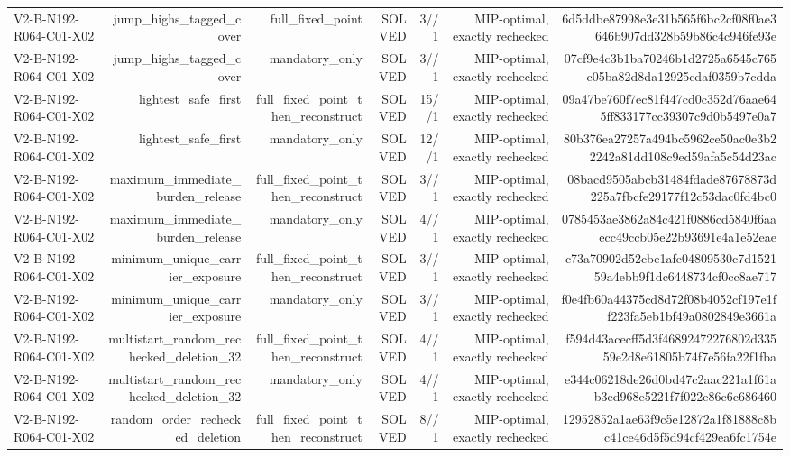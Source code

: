 {\begin{longtable}{lrrrrrr}
V2-B-N192-R064-C01-X02 & jump\_highs\_tagged\_cover & full\_fixed\_point & SOLVED & 3//1 & MIP-optimal, exactly rechecked & 6d5ddbe87998e3e31b565f6bc2cf08f0ae3646b907dd328b59b86c4c946fe93e \\
V2-B-N192-R064-C01-X02 & jump\_highs\_tagged\_cover & mandatory\_only & SOLVED & 3//1 & MIP-optimal, exactly rechecked & 07cf9e4c3b1ba70246b1d2725a6545c765c05ba82d8da12925cdaf0359b7cdda \\
V2-B-N192-R064-C01-X02 & lightest\_safe\_first & full\_fixed\_point\_then\_reconstruct & SOLVED & 15//1 & MIP-optimal, exactly rechecked & 09a47be760f7ec81f447cd0c352d76aae645ff833177cc39307c9d0b5497e0a7 \\
V2-B-N192-R064-C01-X02 & lightest\_safe\_first & mandatory\_only & SOLVED & 12//1 & MIP-optimal, exactly rechecked & 80b376ea27257a494bc5962ce50ac0e3b22242a81dd108c9ed59afa5c54d23ac \\
V2-B-N192-R064-C01-X02 & maximum\_immediate\_burden\_release & full\_fixed\_point\_then\_reconstruct & SOLVED & 3//1 & MIP-optimal, exactly rechecked & 08bacd9505abcb31484fdade87678873d225a7fbcfe29177f12c53dac0fd4bc0 \\
V2-B-N192-R064-C01-X02 & maximum\_immediate\_burden\_release & mandatory\_only & SOLVED & 4//1 & MIP-optimal, exactly rechecked & 0785453ae3862a84c421f0886cd5840f6aaecc49ccb05e22b93691e4a1e52eae \\
V2-B-N192-R064-C01-X02 & minimum\_unique\_carrier\_exposure & full\_fixed\_point\_then\_reconstruct & SOLVED & 3//1 & MIP-optimal, exactly rechecked & c73a70902d52cbe1afe04809530c7d152159a4ebb9f1dc6448734cf0cc8ae717 \\
V2-B-N192-R064-C01-X02 & minimum\_unique\_carrier\_exposure & mandatory\_only & SOLVED & 3//1 & MIP-optimal, exactly rechecked & f0e4fb60a44375cd8d72f08b4052cf197e1ff223fa5eb1bf49a0802849e3661a \\
V2-B-N192-R064-C01-X02 & multistart\_random\_rechecked\_deletion\_32 & full\_fixed\_point\_then\_reconstruct & SOLVED & 4//1 & MIP-optimal, exactly rechecked & f594d43acecff5d3f46892472276802d33559e2d8e61805b74f7e56fa22f1fba \\
V2-B-N192-R064-C01-X02 & multistart\_random\_rechecked\_deletion\_32 & mandatory\_only & SOLVED & 4//1 & MIP-optimal, exactly rechecked & e344c06218de26d0bd47c2aac221a1f61ab3ed968e5221f7f022e86c6c686460 \\
V2-B-N192-R064-C01-X02 & random\_order\_rechecked\_deletion & full\_fixed\_point\_then\_reconstruct & SOLVED & 8//1 & MIP-optimal, exactly rechecked & 12952852a1ae63f9c5e12872a1f81888c8bc41ce46d5f5d94cf429ea6fc1754e \\

\end{longtable}}
